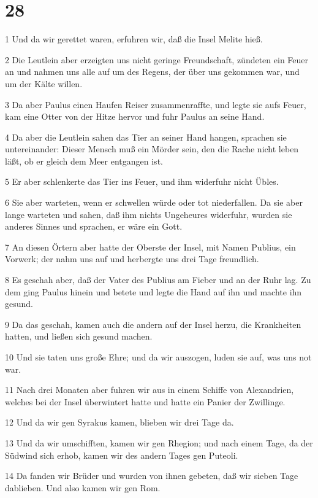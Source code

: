 \chapter{28}

\par 1 Und da wir gerettet waren, erfuhren wir, daß die Insel Melite hieß.
\par 2 Die Leutlein aber erzeigten uns nicht geringe Freundschaft, zündeten ein Feuer an und nahmen uns alle auf um des Regens, der über uns gekommen war, und um der Kälte willen.
\par 3 Da aber Paulus einen Haufen Reiser zusammenraffte, und legte sie aufs Feuer, kam eine Otter von der Hitze hervor und fuhr Paulus an seine Hand.
\par 4 Da aber die Leutlein sahen das Tier an seiner Hand hangen, sprachen sie untereinander: Dieser Mensch muß ein Mörder sein, den die Rache nicht leben läßt, ob er gleich dem Meer entgangen ist.
\par 5 Er aber schlenkerte das Tier ins Feuer, und ihm widerfuhr nicht Übles.
\par 6 Sie aber warteten, wenn er schwellen würde oder tot niederfallen. Da sie aber lange warteten und sahen, daß ihm nichts Ungeheures widerfuhr, wurden sie anderes Sinnes und sprachen, er wäre ein Gott.
\par 7 An diesen Örtern aber hatte der Oberste der Insel, mit Namen Publius, ein Vorwerk; der nahm uns auf und herbergte uns drei Tage freundlich.
\par 8 Es geschah aber, daß der Vater des Publius am Fieber und an der Ruhr lag. Zu dem ging Paulus hinein und betete und legte die Hand auf ihn und machte ihn gesund.
\par 9 Da das geschah, kamen auch die andern auf der Insel herzu, die Krankheiten hatten, und ließen sich gesund machen.
\par 10 Und sie taten uns große Ehre; und da wir auszogen, luden sie auf, was uns not war.
\par 11 Nach drei Monaten aber fuhren wir aus in einem Schiffe von Alexandrien, welches bei der Insel überwintert hatte und hatte ein Panier der Zwillinge.
\par 12 Und da wir gen Syrakus kamen, blieben wir drei Tage da.
\par 13 Und da wir umschifften, kamen wir gen Rhegion; und nach einem Tage, da der Südwind sich erhob, kamen wir des andern Tages gen Puteoli.
\par 14 Da fanden wir Brüder und wurden von ihnen gebeten, daß wir sieben Tage dablieben. Und also kamen wir gen Rom.
